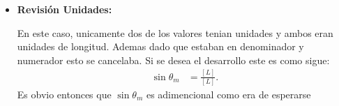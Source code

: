 \documentclass[12pt]{exam}
\begin{document}
\begin{itemize}
  \item \textbf{Revisión Unidades: }

    En este caso, unicamente dos de los valores tenian unidades y ambos eran unidades de longitud. Ademas dado que estaban en denominador y numerador esto se cancelaba. Si se desea el desarrollo este es como sigue:
    \begin{align*}
      \sin\theta_m&= \frac{\left[ L \right] }{\left[ L \right] }
    .\end{align*}
    Es obvio entonces que $\sin\theta_m$ es adimencional como era de esperarse
\end{itemize}
\end{document}
